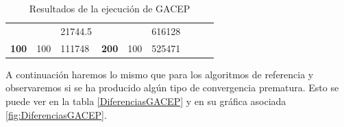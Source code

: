 \begin{table}[]
\begin{tabular}{|cclccllll}
\multicolumn{1}{|c|}{\cellcolor[HTML]{FFFFC7}}                                & \multicolumn{1}{c|}{\cellcolor[HTML]{DDFDFF}}                      & \multicolumn{1}{l|}{\cellcolor[HTML]{DDFDFF}21744.5}   & \multicolumn{1}{c|}{\cellcolor[HTML]{FFFFC7}}                                & \multicolumn{1}{c|}{\cellcolor[HTML]{DDFDFF}}                       & \multicolumn{1}{l|}{\cellcolor[HTML]{DAE8FC}616128}    &                                                                              &                                                                    &                                                        \\ \cline{3-3} \cline{6-6}
\multicolumn{1}{|c|}{\multirow{-39}{*}{\cellcolor[HTML]{FFFFC7}\textbf{100}}} & \multicolumn{1}{c|}{\multirow{-9}{*}{\cellcolor[HTML]{DDFDFF}100}} & \multicolumn{1}{l|}{\cellcolor[HTML]{DAE8FC}111748}    & \multicolumn{1}{c|}{\multirow{-39}{*}{\cellcolor[HTML]{FFFFC7}\textbf{200}}} & \multicolumn{1}{c|}{\multirow{-10}{*}{\cellcolor[HTML]{DDFDFF}100}} & \multicolumn{1}{l|}{\cellcolor[HTML]{DDFDFF}525471}    &                                                                              &                                                                    &                                                        \\ \cline{1-6}
\end{tabular}
\caption{\label{GACEP_Historico}Resultados de la ejecución de GACEP}
\end{table}

A continuación haremos lo mismo que para los algoritmos de referencia y observaremos si se ha producido algún tipo de convergencia prematura. 
Esto se puede ver en la tabla \ref{DiferenciasGACEP} y en su gráfica asociada \ref{fig:DiferenciasGACEP}.

